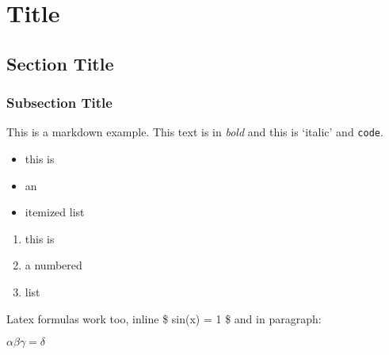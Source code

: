 \hypertarget{title}{%
\section{Title}\label{title}}

\hypertarget{section-title}{%
\subsection{Section Title}\label{section-title}}

\hypertarget{subsection-title}{%
\subsubsection{Subsection Title}\label{subsection-title}}

This is a markdown example. This text is in \emph{bold} and this is
`italic' and \texttt{code}.

\begin{itemize}
\tightlist
\item
  this is
\item
  an
\item
  itemized list
\end{itemize}

\begin{enumerate}
\def\labelenumi{\arabic{enumi}.}
\tightlist
\item
  this is
\item
  a numbered
\item
  list
\end{enumerate}

Latex formulas work too, inline \$ sin(x) = 1 \$ and in paragraph:

\(\alpha \beta \gamma = \delta\)
